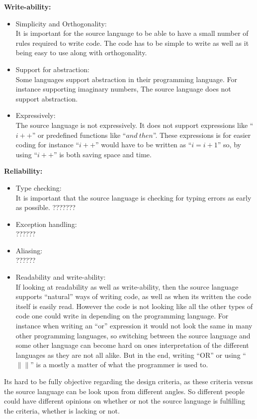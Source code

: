 \textbf{Write-ability:} \\
\begin{itemize}
\item Simplicity and Orthogonality: \\
It is important for the source language to be able to have a small number of rules required to write code. The code has to be simple to write as well as it being easy to use along with orthogonality.
\item Support for abstraction: \\
Some languages support abstraction  in their programming language. For instance supporting imaginary numbers, The source language does not support abstraction. 
\item Expressively: \\
The source language is not expressively. It does not support expressions like ``$i++$'' or predefined functions like ``$and~then$''. These expressions is for easier coding for instance ``$i++$'' would have to be written as ``$i = i + 1$'' so, by using ``$i++$'' is both saving space and time.
\end{itemize}

\textbf{Reliability:} \\
\begin{itemize}
\item Type checking: \\
It is important that the source language is checking for typing errors as early as possible. ???????
\item Exception handling: \\
??????
\item Aliasing: \\
??????
\item Readability and write-ability: \\
If looking at readability as well as write-ability, then the source language supports ``natural'' ways of writing code, as well as when its written the code itself is easily read. However the code is not looking like all the other types of code one could write in depending on the programming language. For instance when writing an ``or'' expression it would not look the same in many other programming languages, so switching between the source language and some other language can become hard on ones interpretation of the different languages as they are not all alike. But in the end, writing ``OR'' or using ``$\|\|$'' is a mostly a matter of what the programmer is used to. 
\end{itemize}
Its hard to be fully objective regarding the design criteria, as these criteria versus the source language can be look upon from different angles. So different people could have different opinions on whether or not the source language is fulfilling the criteria, whether is lacking or not. 